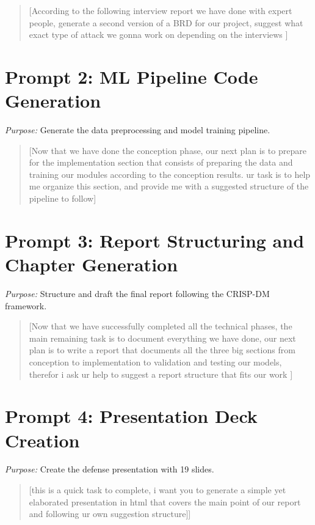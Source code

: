 \documentclass[12pt,a4paper]{report}
\begin{document}
\begin{quote}
\small
[According to the following interview report we have done with expert people, generate a second version of a BRD for our project, suggest what exact type of attack we gonna work on depending on the interviews ]
\end{quote}

\section{Prompt 2: ML Pipeline Code Generation}

\textit{Purpose:} Generate the data preprocessing and model training pipeline.

\begin{quote}
\small
[Now that we have done the conception phase, our next plan is to prepare for the implementation section that consists of preparing the data and training our modules according to the conception results. ur task is to help me organize this section, and provide me with a suggested structure of the pipeline to follow]
\end{quote}

\section{Prompt 3: Report Structuring and Chapter Generation}

\textit{Purpose:} Structure and draft the final report following the CRISP-DM framework.

\begin{quote}
\small
[Now that we have successfully completed all the technical phases, the main remaining task is to document everything we have done, our next plan is to write a report that documents all the three big sections from conception to implementation to validation and testing our models, therefor i ask ur help to suggest a report structure that fits our work ]
\end{quote}

\section{Prompt 4: Presentation Deck Creation}

\textit{Purpose:} Create the defense presentation with 19 slides.

\begin{quote}
\small
[this is a quick task to complete, i want you to generate a simple yet elaborated presentation in html that covers the main point of our report and following ur own suggestion structure]]
\end{quote}
\end{document}
